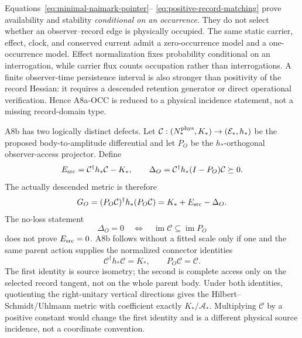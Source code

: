\documentclass[11pt]{article}
\begin{document}
Equations~\eqref{eq:minimal-naimark-pointer}--
\eqref{eq:positive-record-matching} prove availability and stability
\emph{conditional on an occurrence}.  They do not select whether an
observer--record edge is physically occupied.  The same static carrier,
effect, clock, and conserved current admit a zero-occurrence model and a
one-occurrence model.  Effect normalization fixes probability conditional on
an interrogation, while carrier flux counts occupation rather than
interrogations.  A finite observer-time persistence interval is also stronger
than positivity of the record Hessian: it requires a descended retention
generator or direct operational verification.  Hence A8a-OCC is reduced to a
physical incidence statement, not a missing record-domain type.

A8b has two logically distinct defects.  Let
\(\mathcal C:(N_*^{\rm phys},K_*)\to(\mathcal E_*,h_*)\) be the proposed
body-to-amplitude differential and let \(P_O\) be the
\(h_*\)-orthogonal observer-access projector.  Define
\begin{equation}
 E_{\rm src}=\mathcal C^\dagger h_*\mathcal C-K_*,
 \qquad
 \Delta_O=\mathcal C^\dagger h_*(I-P_O)\mathcal C\succeq0.
 \label{eq:a8-two-defects}
\end{equation}
The actually descended metric is therefore
\begin{equation}
 G_O=(P_O\mathcal C)^\dagger h_*(P_O\mathcal C)
 =K_*+E_{\rm src}-\Delta_O.
 \label{eq:a8-gram-loss}
\end{equation}
The no-loss statement
\begin{equation}
 \Delta_O=0
 \quad\Longleftrightarrow\quad
 \operatorname{im}\mathcal C\subseteq\operatorname{im}P_O
 \label{eq:a8-zero-defect}
\end{equation}
does not prove \(E_{\rm src}=0\).  A8b follows without a fitted scale only if
one and the same parent action supplies the normalized connector identities
\begin{equation}
 \boxed{
 \mathcal C^\dagger h_*\mathcal C=K_*,
 \qquad P_O\mathcal C=\mathcal C.}
 \label{eq:a8-source-isometry}
\end{equation}
The first identity is source isometry; the second is complete access only on
the selected record tangent, not on the whole parent body.  Under both
identities, quotienting the right-unitary vertical directions gives the
Hilbert--Schmidt/Uhlmann metric with coefficient exactly
\(K_*/\mathcal A_*\).  Multiplying \(\mathcal C\) by a positive constant would
change the first identity and is a different physical source incidence, not a
coordinate convention.
\end{document}
